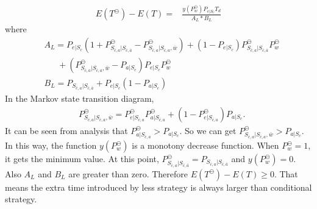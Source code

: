 \begin{equation}
\label{equ:detail1}
\begin{split}
E(T^{\ominus}) - E(T) = &\frac{y(P_{w}^{\ominus})P_{e|S_{c}}T_{d}}{A_{L}*B_{L}}
\end{split}\end{equation}
where
\begin{equation*}
\begin{split}
&A_{L}=P_{e|S_{c}}(1+P_{S_{\bar{c}, a}|S_{\bar{c},\bar{a}}}^{\ominus}-P_{S_{\bar{c}, a}|S_{\bar{c},a},\bar{w}}^{\ominus})+(1-P_{e|S_{c}})P_{S_{\bar{c}, a}|S_{\bar{c},\bar{a}}}^{\ominus}P_{w}^{\ominus}  \\
&\ \ \ \ \ \ \ +(P_{S_{\bar{c}, a}|S_{\bar{c},a},\bar{w}}^{\ominus}-P_{a|S_{c}})P_{e|S_{c}}P_{w}^{\ominus} \\
&B_{L}=P_{S_{\bar{c}, a}|S_{\bar{c},\bar{a}}}+P_{e|S_{c}}(1-P_{a|S_{c}})
\end{split}\end{equation*}
In the Markov state transition diagram,
\begin{equation*}
\begin{split}
&P_{S_{\bar{c}, a}|S_{\bar{c},a},\bar{w}}^{\ominus}=P_{e|S_{\bar{c}, a}}^{\ominus}P_{a|S_{\bar{c}, a}}^{\ominus}+(1-P_{e|S_{\bar{c}, a}}^{\ominus})P_{a|S_{c}} .
\end{split}\end{equation*}
It can be seen from analysis that $P_{a|S_{\bar{c}, a}}^{\ominus} > P_{a|S_{c}}$.
So we can get $P_{S_{\bar{c}, a}|S_{\bar{c},a},\bar{w}}^{\ominus} > P_{a|S_{c}}$.
In this way,
the function $y(P_{w}^{\ominus})$ is a monotony decrease function. When $P_{w}^{\ominus} = 1$, it gets the minimum value.
At this point, $P_{S_{\bar{c}, a}|S_{\bar{c},\bar{a}}}^{\ominus} = P_{S_{\bar{c}, a}|S_{\bar{c},\bar{a}}}$ and $y(P_{w}^{\ominus}) = 0$.
Also $A_{L}$ and $B_{L}$ are greater than zero.
Therefore $E(T^{\ominus}) - E(T)\geq 0$.
That means the extra time introduced by less {\vwarm} strategy is always larger than conditional {\vwarm} strategy.

